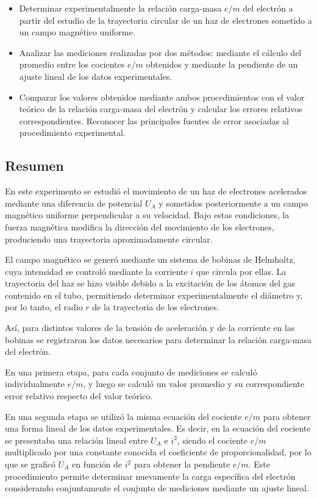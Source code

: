 \documentclass{article}
\begin{document}
\begin{itemize}
    \item Determinar experimentalmente la relación carga-masa \(e/m\) del electrón a partir del estudio de la trayectoria circular de un haz de electrones sometido a un campo magnético uniforme.

    \item Analizar las mediciones realizadas por dos métodos: mediante el cálculo del promedio entre los cocientes \(e/m\) obtenidos y mediante la pendiente de un ajuste lineal de los datos experimentales.

    \item Comparar los valores obtenidos mediante ambos procedimientos con el valor teórico de la relación carga-masa del electrón y calcular los errores relativos correspondientes. Reconocer las principales fuentes de error asociadas al procedimiento experimental.

\end{itemize}

\subsection{Resumen}

En este experimento se estudió el movimiento de un haz de electrones acelerados mediante una diferencia de potencial \(U_A\) y sometidos posteriormente a un campo magnético uniforme perpendicular a su velocidad. Bajo estas condiciones, la fuerza magnética modifica la dirección del movimiento de los electrones, produciendo una trayectoria aproximadamente circular.

El campo magnético se generó mediante un sistema de bobinas de Helmholtz, cuya intensidad se controló mediante la corriente \(i\) que circula por ellas. La trayectoria del haz se hizo visible debido a la excitación de los átomos del gas contenido en el tubo, permitiendo determinar experimentalmente el diámetro y, por lo tanto, el radio \(r\) de la trayectoria de los electrones.

Así, para distintos valores de la tensión de aceleración y de la corriente en las bobinas se registraron los datos necesarios para determinar la relación carga-masa del electrón. 

En una primera etapa, para cada conjunto de mediciones se calculó individualmente \(e/m\), y luego se calculó un valor promedio y su correspondiente error relativo respecto del valor teórico.

En una segunda etapa se utilizó la misma ecuación del cociente \(e/m\) para obtener una forma lineal de los datos experimentales. Es decir, en la ecuación del cociente se presentaba una relación lineal entre \( U_A\) e \( i^2\), siendo el cociente \(e/m\) multiplicado por una constante conocida el coeficiente de proporcionalidad, por lo que se graficó \( U_A\) en función de \( i^2\) para obtener la pendiente \(e/m\). Este procedimiento permite determinar nuevamente la carga específica del electrón considerando conjuntamente el conjunto de mediciones mediante un ajuste lineal.
\end{document}

